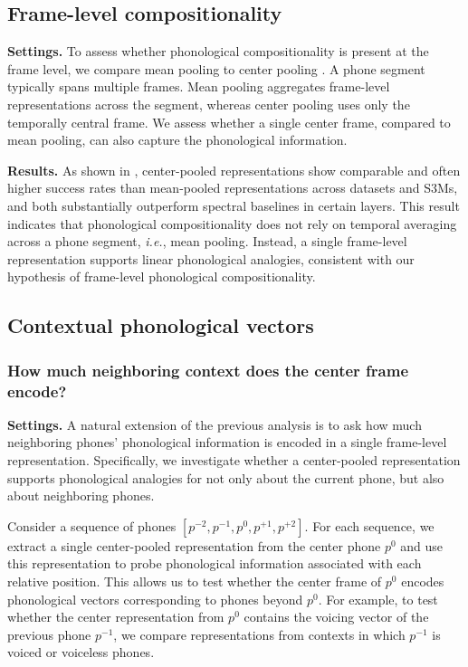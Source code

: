 \documentclass[cameraready]{Interspeech}
\begin{document}
\subsection{Frame-level compositionality}\label{ss:pooling}
\textbf{Settings.}
To assess whether phonological compositionality is present at the frame level, we compare mean pooling \cite{pasad2021layer,pasad2023comparative,choi2026self} to center pooling \cite{pasad2024self,choi2024self,choi2025leveraging}.
A phone segment typically spans multiple frames.
Mean pooling aggregates frame-level representations across the segment, whereas center pooling uses only the temporally central frame.
We assess whether a single center frame, compared to mean pooling, can also capture the phonological information.



\textbf{Results.}
As shown in , center-pooled representations show comparable and often higher success rates than mean-pooled representations across datasets and S3Ms, and both substantially outperform spectral baselines in certain layers.
This result indicates that phonological compositionality does not rely on temporal averaging across a phone segment, \textit{i.e.}, mean pooling.
Instead, a single frame-level representation supports linear phonological analogies, consistent with our hypothesis of frame-level phonological compositionality.


\subsection{Contextual phonological vectors}\label{ss:neighbors}
\subsubsection{How much neighboring context does the center frame encode?}\label{ss:neighbors-center}
\textbf{Settings.}
A natural extension of the previous analysis is to ask how much neighboring phones' phonological information is encoded in a single frame-level representation.
Specifically, we investigate whether a center-pooled representation supports phonological analogies for not only about the current phone, but also about neighboring phones.


Consider a sequence of phones $[p^{-2}, p^{-1}, p^{0}, p^{+1}, p^{+2}]$.
For each sequence, we extract a single center-pooled representation from the center phone $p^{0}$ and use this representation to probe phonological information associated with each relative position.
This allows us to test whether the center frame of $p^{0}$ encodes phonological vectors corresponding to phones beyond $p^0$.
For example, to test whether the center representation from $p^{0}$ contains the voicing vector of the previous phone $p^{-1}$, we compare representations from contexts in which $p^{-1}$ is voiced or voiceless phones.
\end{document}
